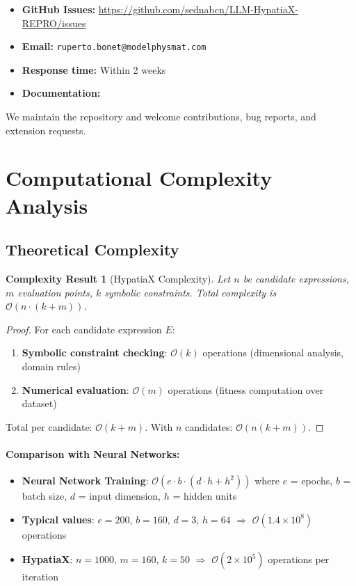 \documentclass[twoside,11pt]{article}
\newtheorem{complexity}{Complexity Result}
\providecommand{\qed}{\hfill\BlackBox}
\begin{document}
\begin{itemize}
\item \textbf{GitHub Issues:} \url{https://github.com/sednabcn/LLM-HypatiaX-REPRO/issues}
\item \textbf{Email:} \texttt{ruperto.bonet@modelphysmat.com}
\item \textbf{Response time:} Within 2 weeks
\item \textbf{Documentation:} 
\end{itemize}

We maintain the repository and welcome contributions, bug reports, and extension requests.



\section{Computational Complexity Analysis}
\label{app:complexity}

\subsection{Theoretical Complexity}

\begin{complexity}[HypatiaX Complexity]
Let $n$ be candidate expressions, $m$ evaluation points, $k$ symbolic constraints. Total complexity is $\mathcal{O}(n \cdot (k + m))$.
\end{complexity}

\begin{proof}
For each candidate expression $E$:
\begin{enumerate}
\item \textbf{Symbolic constraint checking}: $\mathcal{O}(k)$ operations (dimensional analysis, domain rules)
\item \textbf{Numerical evaluation}: $\mathcal{O}(m)$ operations (fitness computation over dataset)
\end{enumerate}

Total per candidate: $\mathcal{O}(k + m)$. With $n$ candidates: $\mathcal{O}(n(k + m))$. \qed
\end{proof}

\paragraph{Comparison with Neural Networks:}
\begin{itemize}
\item \textbf{Neural Network Training}: $\mathcal{O}(e \cdot b \cdot (d \cdot h + h^2))$ where $e$ = epochs, $b$ = batch size, $d$ = input dimension, $h$ = hidden units
\item \textbf{Typical values}: $e=200$, $b=160$, $d=3$, $h=64$ $\Rightarrow$ $\mathcal{O}(1.4 \times 10^8)$ operations
\item \textbf{HypatiaX}: $n=1000$, $m=160$, $k=50$ $\Rightarrow$ $\mathcal{O}(2 \times 10^5)$ operations per iteration
\end{itemize}
\end{document}
